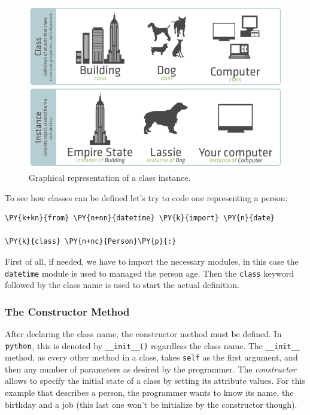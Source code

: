 \begin{figure}[htb]
  \centering
  \includegraphics[width=0.8\linewidth]{figures/classes_instances.png}
  \caption{Graphical representation of a class instance.}
  \label{fig:classes}
\end{figure}

To see how classes can be defined let's try to code one representing a person:
\begin{codebox}[breakable, size=fbox, boxrule=1pt, pad at break*=1mm,colback=cellbackground, colframe=cellborder]
\begin{Verbatim}[commandchars=\\\{\}]
\PY{k+kn}{from} \PY{n+nn}{datetime} \PY{k}{import} \PY{n}{date}        

\PY{k}{class} \PY{n+nc}{Person}\PY{p}{:}
\end{Verbatim}
\end{codebox}

First of all, if needed, we have to import the necessary modules, in this case the 
\texttt{datetime} module is used to managed the person age.
Then the \texttt{class} keyword followed by the class name is used to start the actual definition.

\subsubsection{The Constructor Method}\label{the-constructor-method}

After declaring the class name, the constructor method must be defined.
In \(\tt{python}\), this is denoted by \texttt{\_\_init\_\_()}
regardless the class name. The \texttt{\_\_init\_\_} method, as every
other method in a class, takes \texttt{self} as the first argument, and then any
number of parameters as desired by the programmer. The \emph{constructor}
allows to specify the initial state of a class by setting its attribute
values. For this example that describes a person, the programmer wants
to know its name, the birthday and a job (this last one won't be initialize by the constructor though).

